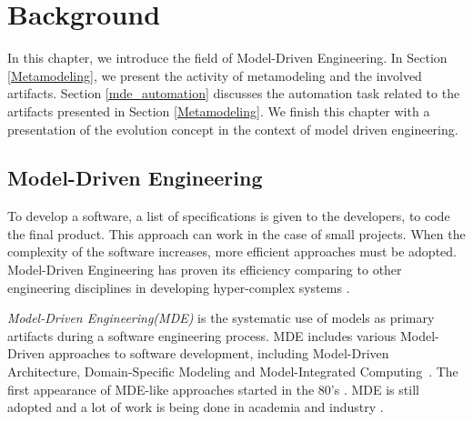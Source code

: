 \clearemptydoublepage
\chapter{Background}

In this chapter, we introduce the field of Model-Driven Engineering. In Section \ref{Metamodeling}, we present the activity of metamodeling and the involved artifacts. Section \ref{mde_automation} discusses the automation task related to the artifacts presented in Section \ref{Metamodeling}. We finish this chapter with a presentation of the evolution concept in the context of model driven engineering.

\section{Model-Driven Engineering}
\label{mde}
To develop a software, a list of specifications is given to the developers, to code the final product. This approach can work in the case of small projects. When the complexity of the software increases, more efficient approaches must be adopted. Model-Driven Engineering has proven its efficiency comparing to other engineering disciplines in developing hyper-complex systems \cite{1231146}.

\textit{Model-Driven Engineering(MDE)} is the systematic use of models as primary artifacts during a software engineering process. MDE includes various Model-Driven approaches to software development, including Model-Driven Architecture, Domain-Specific Modeling and Model-Integrated Computing~\cite{10.1145/1985793.1985882}. The first appearance of MDE-like approaches started in the 80's \cite{10.1007/s10270-005-0079-0}. MDE is still adopted  and a lot of work is being done in academia and industry \cite{Mohagheghi2009,mohagheghi2008proof,jongeling2022Structural,wortmann2020modeling}.




